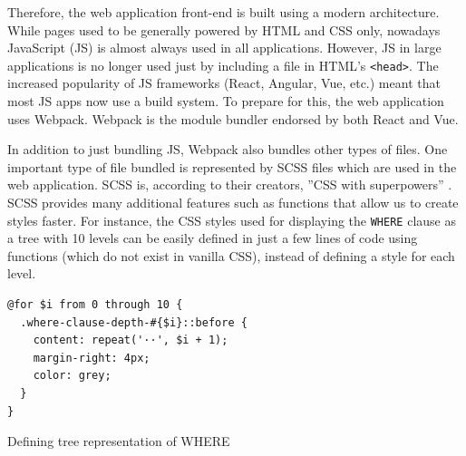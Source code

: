 Therefore, the web application front-end is built using a modern architecture. While pages used to be generally powered by HTML and CSS only, nowadays JavaScript (JS) is almost always used in all applications. However, JS in large applications is no longer used just by including a file in HTML's \texttt{<head>}. The increased popularity of JS frameworks (React, Angular, Vue, etc.) meant that most JS apps now use a build system. To prepare for this, the web application uses Webpack.  Webpack is the  module bundler endorsed by both React and Vue.

In addition to just bundling JS, Webpack also bundles other types of files. One important type of file bundled is represented by SCSS files which are used in the web application. SCSS is, according to their creators, ''CSS with superpowers'' \citep{SassSynt0:online}. SCSS provides many additional features such as functions that allow us to create styles faster. For instance, the CSS styles used for displaying the \texttt{WHERE} clause as a tree with 10 levels can be easily defined in just a few lines of code using functions (which do not exist in vanilla CSS), instead of defining a style for each level.

\begin{code}
\begin{verbatim}
@for $i from 0 through 10 {
  .where-clause-depth-#{$i}::before {
    content: repeat('··', $i + 1);
    margin-right: 4px;
    color: grey;
  }
}
\end{verbatim}
\caption{Defining tree representation of WHERE}
\label{fig:scss}
\end{code}

